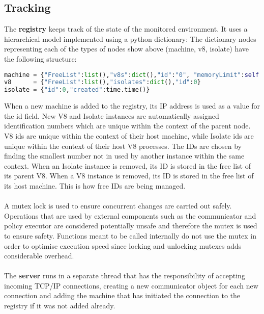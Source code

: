 \documentclass{l4proj}
\begin{document}
\subsection{Tracking}
\hspace*{3em} The \textbf{registry} keeps track of the state of the monitored environment. It uses a hierarchical model implemented using a python dictionary:
The dictionary nodes representing each of the types of nodes show above (machine, v8, isolate) have the following structure: 
\begin{lstlisting}[language=python]
machine = {"FreeList":list(),"v8s":dict(),"id":"0", "memoryLimit":self.newMachineMemLimit}
v8      = {"FreeList":list(),"isolates":dict(),"id":0}
isolate = {"id":0,"created":time.time()}
\end{lstlisting}
\hspace*{3em} When a new machine is added to the registry, its IP address is used as a value for the id field. New V8 and Isolate instances are automatically assigned identification numbers which are unique within the context of the parent node. V8 ids are unique within the context of their host machine, while Isolate ids are unique within the context of their host V8 processes. The IDs are chosen by finding the smallest number not in used by another instance within the same context. When an Isolate instance is removed, its ID is stored in the free list of its parent V8. When a V8 instance is removed, its ID is stored in the free list of its host machine. This is how free IDs are being managed.
\\\\
\hspace*{3em} A mutex lock is used to ensure concurrent changes are carried out safely. Operations that are used by external components such as the communicator and policy executor are considered potentially unsafe and therefore the mutex is used to ensure safety. Functions meant to be called internally do not use the mutex in order to optimise execution speed since locking and unlocking mutexes adds considerable overhead.
\\\\
\hspace*{3em} The \textbf{server} runs in a separate thread that has the responsibility of accepting incoming TCP/IP connections, creating a new communicator object for each new connection and adding the machine that has initiated the connection to the registry if it was not added already.
\end{document}
